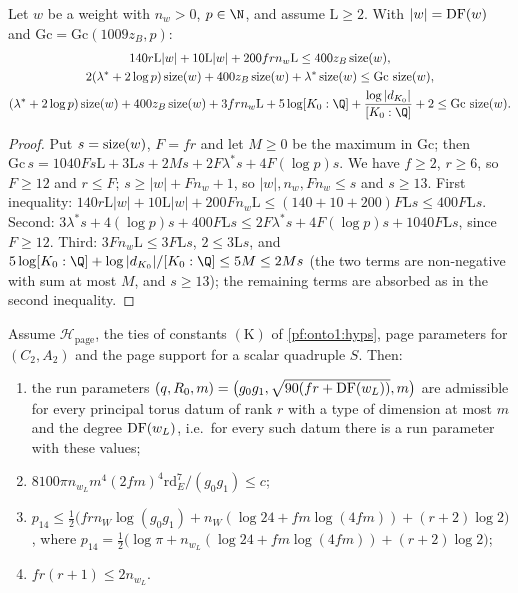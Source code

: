 \begin{lemma}\label{pf:onto3:gc}
Let $w$ be a weight with $n_w>0$, $p\in\N$, and assume $\mathrm L\ge2$. With $|w|=\operatorname{DF}(w)$ and $\mathrm{Gc}=
\mathrm{Gc}(1009z_B,p)$:
\begin{gather*}
140r\mathrm L|w|+10\mathrm L|w|+200frn_w\mathrm L\le400z_B\ontothreesize(w),\\
2(\lambda^*+2\log p)\ontothreesize(w)+400z_B\ontothreesize(w)+\lambda^*\ontothreesize(w)\le\mathrm{Gc}\,\ontothreesize(w),\\
(\lambda^*+2\log p)\ontothreesize(w)+400z_B\ontothreesize(w)+3frn_w\mathrm L+5\log[K_0:\Q]+\frac{\log|d_{K_0}|}{[K_0:\Q]}+2
\le\mathrm{Gc}\,\ontothreesize(w).
\end{gather*}
\end{lemma}

\begin{proof}
Put $s=\operatorname{size}(w)$, $F=fr$ and let $M\ge0$ be the maximum in $\mathrm{Gc}$; then $\mathrm{Gc}\,s=1040Fs\mathrm L+3\mathrm Ls+
2Ms+2F\lambda^*s+4F(\log p)s$. We have $f\ge2$, $r\ge6$, so $F\ge12$ and $r\le F$; $s\ge|w|+Fn_w+1$, so $|w|,n_w,Fn_w\le s$
and $s\ge13$. First inequality: $140r\mathrm L|w|+10\mathrm L|w|+200F n_w\mathrm L\le(140+10+200)F\mathrm Ls\le400F\mathrm Ls$.
Second: $3\lambda^*s+4(\log p)s+400F\mathrm Ls\le2F\lambda^*s+4F(\log p)s+1040F\mathrm Ls$, since $F\ge12$. Third: $3Fn_w\mathrm L\le3F\mathrm Ls$, $2\le3\mathrm Ls$, and $5\log[K_0:\Q]+\log|d_{K_0}|/[K_0:\Q]\le5M\le2Ms$ (the two
terms are non-negative with sum at most $M$, and $s\ge13$); the remaining terms are absorbed as in the second inequality.
\end{proof}

\begin{lemma}\label{pf:onto3:runrec}
Assume $\mathcal H_{\mathrm{page}}$, the ties of constants $(\mathrm K)$ of \cref{pf:onto1:hyps}, page parameters for
$(C_2,A_2)$ and the page support for a scalar quadruple $S$. Then:
\begin{enumerate}[label=(\roman*)]
\item the run parameters $(q,R_0,m)=\bigl(g_0g_1,\sqrt{90(fr+\operatorname{DF}(w_L))},m\bigr)$ are admissible for every
principal torus datum of rank $r$ with a type of dimension at most $m$ and the degree $\operatorname{DF}(w_L)$, i.e.\ for
every such datum there is a run parameter with these values;
\item $8100\pi n_{w_L}m^4(2fm)^4\mathrm{rd}_E^{7}/(g_0g_1)\le c$;
\item $p_{14}\le\frac12\bigl(frn_W\log(g_0g_1)+n_W(\log24+fm\log(4fm))+(r+2)\log2\bigr)$, where
$p_{14}=\frac12\bigl(\log\pi+n_{w_L}(\log24+fm\log(4fm))+(r+2)\log2\bigr)$;
\item $fr(r+1)\le2n_{w_L}$.
\end{enumerate}
\end{lemma}

